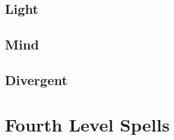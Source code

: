 \begin{multicols}{2}

\subsection{Light}


\subsection{Mind}


\subsection{Divergent}


\end{multicols}

\section{Fourth Level Spells}

